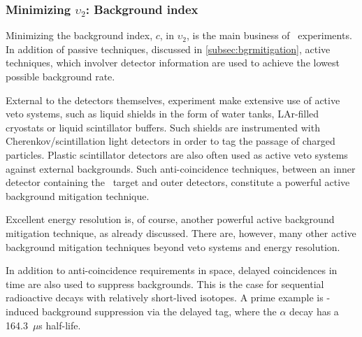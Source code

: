  

\subsubsection{Minimizing $\upsilon_2$: Background index} %

Minimizing the background index, $c$, in $\upsilon_2$, is the main business of 
\bbonu\ experiments. In addition of passive techniques, discussed in 
\ref{subsec:bgrmitigation}, active techniques, which involver detector information are used to achieve the lowest possible background rate.


External to the detectors themselves, experiment make extensive use of {active} veto systems, such as 
liquid shields in the form of water tanks, LAr-filled cryostats or liquid scintillator buffers. Such shields are instrumented with Cherenkov/scintillation light detectors in order to tag the passage of charged particles. Plastic scintillator detectors are also often used as active veto systems against external backgrounds. Such anti-coincidence techniques, between an inner detector containing the \bbonu\ target and outer detectors, constitute a powerful active background mitigation technique. 

Excellent energy resolution is, of course, another powerful active background mitigation technique, as already discussed. There are, however, many other active background mitigation techniques beyond veto systems and energy resolution. 

In addition to anti-coincidence requirements in space, delayed coincidences in time are also used to suppress backgrounds. This is the case for sequential radioactive decays with relatively short-lived isotopes. A prime example is -induced background suppression via the delayed  tag, where the  $\alpha$ decay has a 164.3~$\mu$s half-life. 


